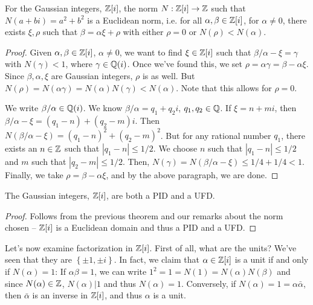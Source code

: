 \documentclass{../mathnotes}
\begin{document}
\begin{thm}
    For the Gaussian integers, $\mathbb{Z}[i]$, the norm $N:\mathbb{Z}[i]\to\mathbb{Z}$ such that $N(a+bi)=a^2+b^2$ is a Euclidean norm,
    i.e. for all $\alpha,\beta\in\mathbb{Z}[i]$, for $\alpha\neq0$, there exists $\xi,\rho$ such that $\beta=\alpha\xi+\rho$
    with either $\rho=0$ or $N(\rho)<N(\alpha)$.
\end{thm}
\begin{proof}
    Given $\alpha,\beta\in\mathbb{Z}[i]$, $\alpha\neq0$, we want to find $\xi\in\mathbb{Z}[i]$ such that $\beta/\alpha-\xi=\gamma$
    with $N(\gamma)<1$, where $\gamma\in\mathbb{Q}(i)$. Once we've found this, we set $\rho=\alpha\gamma=\beta-\alpha\xi$.
    Since $\beta,\alpha,\xi$ are Gaussian integers, $\rho$ is as well. But $N(\rho)=N(\alpha\gamma)=N(\alpha)N(\gamma)<N(\alpha)$.
    Note that this allows for $\rho=0$.

    We write $\beta/\alpha\in\mathbb{Q}(i)$. We know $\beta/\alpha=q_1+q_2i$, $q_1,q_2\in\mathbb{Q}$. If $\xi=n+mi$, then
    $\beta/\alpha-\xi=(q_1-n)+(q_2-m)i$. Then $N(\beta/\alpha-\xi)=(q_1-n)^2+(q_2-m)^2$. But for any rational
    number $q_1$, there exists an $n\in\mathbb{Z}$ such that $|q_1-n|\leq 1/2$. We choose $n$ such that $|q_1-n|\leq 1/2$
    and $m$ such that $|q_2-m|\leq1/2$. Then, $N(\gamma)=N(\beta/\alpha-\xi)\leq1/4+1/4<1$. Finally, we take
    $\rho=\beta-\alpha\xi$, and by the above paragraph, we are done.
\end{proof}

\begin{cor}
    The Gaussian integers, $\mathbb{Z}[i]$, are both a PID and a UFD.
\end{cor}
\begin{proof}
    Follows from the previous theorem and our remarks about the norm chosen -- $\mathbb{Z}[i]$ is a Euclidean domain
    and thus a PID and a UFD.
\end{proof}

Let's now examine factorization in $\mathbb{Z}[i]$. First of all, what are the units? We've seen that they are $\left\{ \pm1,\pm i \right\}$.
In fact, we claim that $\alpha\in\mathbb{Z}[i]$ is a unit if and only if $N(\alpha)=1$: If $\alpha\beta=1$, we can write $1^2=1=N(1)=N(\alpha)N(\beta)$
and since $N(\alpha)\in\mathbb{Z}$, $N(\alpha)|1$ and thus $N(\alpha)=1$. Conversely, if $N(\alpha)=1=\alpha\bar\alpha$, then $\bar\alpha$
is an inverse in $\mathbb{Z}[i]$, and thus $\alpha$ is a unit.
\end{document}
